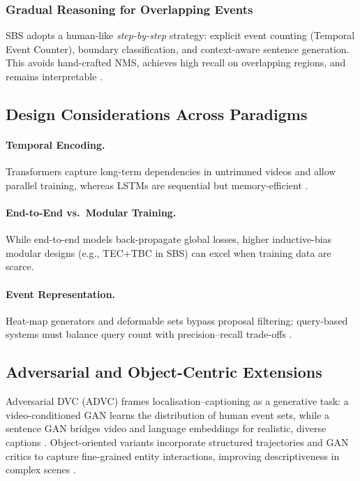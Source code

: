 \subsubsection{Gradual Reasoning for Overlapping Events}  
SBS adopts a human-like \emph{step-by-step} strategy: explicit event counting (Temporal Event Counter), boundary classification, and context-aware sentence generation.  
This avoids hand-crafted NMS, achieves high recall on overlapping regions, and remains interpretable \cite{StepByStep2023}.

\subsection{Design Considerations Across Paradigms}
\paragraph{Temporal Encoding.}  
Transformers capture long-term dependencies in untrimmed videos and allow parallel training, whereas LSTMs are sequential but memory-efficient \cite{krishna2017dense,zhou2018end,wang2021end}.  

\paragraph{End-to-End vs.\ Modular Training.}  
While end-to-end models back-propagate global losses, higher inductive-bias modular designs (e.g., TEC+TBC in SBS) can excel when training data are scarce.

\paragraph{Event Representation.}  
Heat-map generators and deformable sets bypass proposal filtering; query-based systems must balance query count with precision–recall trade-offs \cite{Choi2023-so}.

\subsection{Adversarial and Object-Centric Extensions}
Adversarial DVC (ADVC) frames localisation–captioning as a generative task: a video-conditioned GAN learns the distribution of human event sets, while a sentence GAN bridges video and language embeddings for realistic, diverse captions \cite{ssrn-4835759}.  
Object-oriented variants incorporate structured trajectories and GAN critics to capture fine-grained entity interactions, improving descriptiveness in complex scenes \cite{Zhu2022-mg}.


